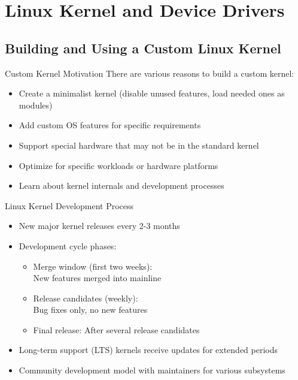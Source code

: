 \section{Linux Kernel and Device Drivers}

\subsection{Building and Using a Custom Linux Kernel}

\begin{concept}{Custom Kernel Motivation}
    There are various reasons to build a custom kernel:
    \begin{itemize}
        \item Create a minimalist kernel (disable unused features, load needed ones as modules)
        \item Add custom OS features for specific requirements
        \item Support special hardware that may not be in the standard kernel
        \item Optimize for specific workloads or hardware platforms
        \item Learn about kernel internals and development processes
    \end{itemize}
\end{concept}


\begin{definition}{Linux Kernel Development Process}
    \begin{itemize}
        \item New major kernel releases every 2-3 months
        \item Development cycle phases:
            \begin{itemize}
                \item Merge window (first two weeks): \\ New features merged into mainline
                \item Release candidates (weekly): \\ Bug fixes only, no new features
                \item Final release: After several release candidates
            \end{itemize}
        \item Long-term support (LTS) kernels receive updates for extended periods
        \item Community development model with maintainers for various subsystems
    \end{itemize}
\end{definition}

